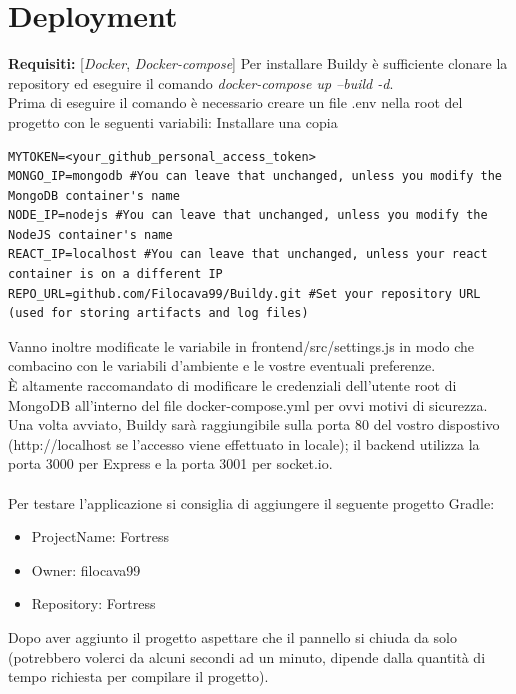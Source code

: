 \documentclass{report}
\begin{document}
\section{Deployment}
\textbf{Requisiti:} [\textit{Docker}, \textit{Docker-compose}]
Per installare Buildy è sufficiente clonare la repository ed eseguire il comando \textit{docker-compose up --build -d}.\\
Prima di eseguire il comando è necessario creare un file .env nella root del progetto con le seguenti variabili:
Installare una copia
\begin{lstlisting}
MYTOKEN=<your_github_personal_access_token>
MONGO_IP=mongodb #You can leave that unchanged, unless you modify the MongoDB container's name
NODE_IP=nodejs #You can leave that unchanged, unless you modify the NodeJS container's name
REACT_IP=localhost #You can leave that unchanged, unless your react container is on a different IP
REPO_URL=github.com/Filocava99/Buildy.git #Set your repository URL (used for storing artifacts and log files)
\end{lstlisting}
Vanno inoltre modificate le variabile in frontend/src/settings.js in modo che combacino con le variabili d'ambiente e le vostre eventuali preferenze.\\
È altamente raccomandato di modificare le credenziali dell'utente root di MongoDB all'interno del file docker-compose.yml per ovvi motivi di sicurezza.\\
Una volta avviato, Buildy sarà raggiungibile sulla porta 80 del vostro dispostivo (http://localhost se l'accesso viene effettuato in locale); il backend utilizza la porta 3000 per Express e la porta 3001 per socket.io.\\
\\
Per testare l'applicazione si consiglia di aggiungere il seguente progetto Gradle:\\
\begin{itemize}
\item ProjectName: Fortress
\item Owner: filocava99
\item Repository: Fortress
\end{itemize}
Dopo aver aggiunto il progetto aspettare che il pannello si chiuda da solo (potrebbero volerci da alcuni secondi ad un minuto, dipende dalla quantità di tempo richiesta per compilare il progetto).
\end{document}
